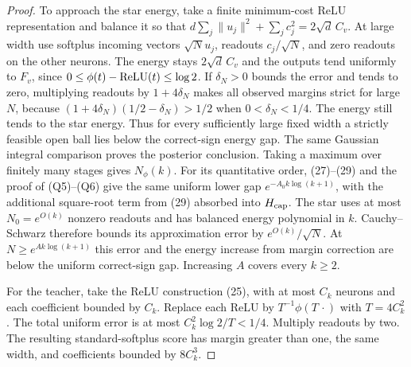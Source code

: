 \documentclass[11pt]{article}
\begin{document}
\begin{proof}
To approach the star energy, take a finite minimum-cost ReLU
representation and balance it so that
$d\sum_j\|u_j\|^2+\sum_j c_j^2=2\sqrt d\,C_v$.
At large width use softplus incoming vectors $\sqrt N u_j$,
readouts $c_j/\sqrt N$, and zero readouts on the other neurons.
The energy stays $2\sqrt d\,C_v$ and the outputs tend uniformly to
$F_v$, since $0\le\phi(t)-\operatorname{ReLU}(t)\le\log2$.
If $\delta_N>0$ bounds the error and tends to zero, multiplying
readouts by $1+4\delta_N$ makes all observed margins strict for large
$N$, because $(1+4\delta_N)(1/2-\delta_N)>1/2$ when
$0<\delta_N<1/4$. The energy still tends to the star energy.
Thus for every sufficiently large fixed width a strictly feasible
open ball lies below the correct-sign energy gap.
The same Gaussian integral comparison proves the posterior conclusion.
Taking a maximum over finitely many stages gives $N_\phi(k)$.
For its quantitative order, (27)--(29) and the proof of (Q5)--(Q6)
give the same uniform lower gap $e^{-A_0k\log(k+1)}$, with the
additional square-root term from (29) absorbed into $H_{\rm cap}$.
The star uses at most $N_0=e^{O(k)}$ nonzero readouts and has balanced
energy polynomial in $k$. Cauchy--Schwarz therefore bounds its
approximation error by $e^{O(k)}/\sqrt N$.
At $N\ge e^{A k\log(k+1)}$ this error and the energy increase from
margin correction are below the uniform correct-sign gap.
Increasing $A$ covers every $k\ge2$.

For the teacher, take the ReLU construction (25), with at most $C_k$
neurons and each coefficient bounded by $C_k$. Replace each ReLU by
$T^{-1}\phi(T\,\cdot)$ with $T=4C_k^2$.
The total uniform error is at most
$C_k^2\log2/T<1/4$. Multiply readouts by two.
The resulting standard-softplus score has margin greater than one,
the same width, and coefficients bounded by $8C_k^3$.
\end{proof}
\end{document}
